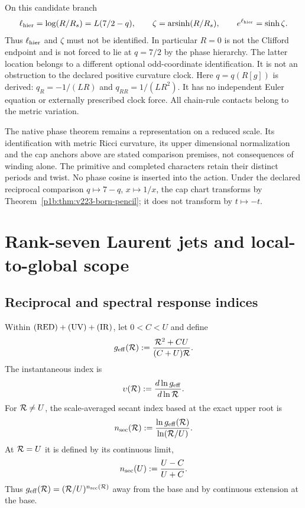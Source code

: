\documentclass[12pt,a4paper]{article}
\begin{document}
\begin{remark}
\label{p3d:rem:v223-log-asinh}
On this candidate branch
\[
 \ell_{\rm hier}=\log(R/R_s)=L(7/2-q),\qquad
 \zeta=\operatorname{arsinh}(R/R_s),\qquad
 e^{\ell_{\rm hier}}=\sinh\zeta.
\]
Thus $\ell_{\rm hier}$ and $\zeta$ must not be identified.  In
particular $R=0$ is not the Clifford endpoint and is not forced to lie
at $q=7/2$ by the phase hierarchy.  The latter location belongs to a
different optional odd-coordinate identification.  It is not an
obstruction to the declared positive curvature clock.
Here $q=q(R[g])$ is derived: $q_R=-1/(LR)$ and $q_{RR}=1/(LR^2)$.
It has no independent Euler equation or externally prescribed clock
force.  All chain-rule contacts belong to the metric variation.
\end{remark}
The native phase theorem remains a representation on a reduced scale.
Its identification with metric Ricci curvature, its upper dimensional
normalization and the cap anchors above are stated comparison premises,
not consequences of winding alone.  The primitive and completed
characters retain their distinct periods and twist.  No phase cosine
is inserted into the action.  Under the declared reciprocal comparison
$q\mapsto7-q$, $x\mapsto1/x$, the cap chart transforms by
Theorem~\ref{p1b:thm:v223-born-pencil}; it does not transform by $t\mapsto-t$.


\section{Rank-seven Laurent jets and local-to-global scope}
\label{paper3d:sec:organized-laurent}
\subsection{Reciprocal and spectral response indices}

\begin{definition}
Within \(({\rm RED})+({\rm UV})+({\rm IR})\), let \(0<C<U\) and define
\begin{equation}
\label{p3:eq:geff_def}
 g_{\mathrm{eff}}(\mathcal R)
 :=\frac{\mathcal R^2+CU}{(C+U)\mathcal R}.
\end{equation}
The instantaneous index is
\begin{equation}
\upsilon(\mathcal R)
:=\frac{d\ln g_{\mathrm{eff}}}{d\ln\mathcal R}.
\label{p3:eq:upsilon_def}
\end{equation}
For \(\mathcal R\ne U\), the scale-averaged secant index based at the exact upper
root is
\begin{equation}
\label{p3:eq:n_secant_def}
 n_{\rm sec}(\mathcal R)
 :=\frac{\ln g_{\mathrm{eff}}(\mathcal R)}{\ln(\mathcal R/U)}.
\end{equation}
At \(\mathcal R=U\) it is defined by its continuous limit,
\[
 n_{\rm sec}(U):=\frac{U-C}{U+C}.
\]
Thus \(g_{\mathrm{eff}}(\mathcal R)=(\mathcal R/U)^{n_{\rm sec}(\mathcal R)}\) away from the base and by
continuous extension at the base.
\end{definition}
\end{document}

